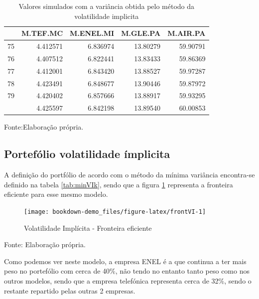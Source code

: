 \documentclass[
  12pt,
  a4paper,
  openany]{book}
\theoremstyle{definition}
\theoremstyle{definition}
\theoremstyle{definition}
\theoremstyle{remark}
\begin{document}
\begin{table}[!h]

\caption{\label{tab:SimVIk}Valores simulados com a variância obtida pelo método da volatilidade implicita}
\centering
\begin{tabular}[t]{lrrrr}
\toprule
  & M.TEF.MC & M.ENEL.MI & M.GLE.PA & M.AIR.PA\\
\midrule
75 & 4.412571 & 6.836974 & 13.80279 & 59.90791\\
76 & 4.407512 & 6.822441 & 13.83433 & 59.86369\\
77 & 4.412001 & 6.843420 & 13.88527 & 59.97287\\
78 & 4.423491 & 6.848677 & 13.90446 & 59.87972\\
79 & 4.420402 & 6.857666 & 13.88917 & 59.93295\\
\addlinespace
80 & 4.425597 & 6.842198 & 13.89540 & 60.00853\\
\bottomrule
\end{tabular}
\end{table}
\FloatBarrier
\centering

Fonte:Elaboração própria.

\justifying
\bigskip

\hypertarget{portefuxf3lio-volatilidade-uxedmplicita}{%
\subsection{Portefólio volatilidade ímplicita}\label{portefuxf3lio-volatilidade-uxedmplicita}}

A definição do portfólio de acordo com o método da mínima variância encontra-se definido na tabela \ref{tab:minVIk}, sendo que a figura \ref{fig:frontVI} representa a fronteira eficiente para esse mesmo modelo.

\begin{figure}

{\centering \texttt{[image: bookdown-demo\_files/figure-latex/frontVI-1]} 

}

\caption{Volatilidade Implícita - Fronteira eficiente}\label{fig:frontVI}
\end{figure}
\FloatBarrier
\centering

Fonte: Elaboração própria.

\justifying
\bigskip

Como podemos ver neste modelo, a empresa ENEL é a que continua a ter mais peso no portefólio com cerca de 40\%, não tendo no entanto tanto peso como nos outros modelos, sendo que a empresa telefónica representa cerca de 32\%, sendo o restante repartido pelas outras 2 empresas.
\end{document}
